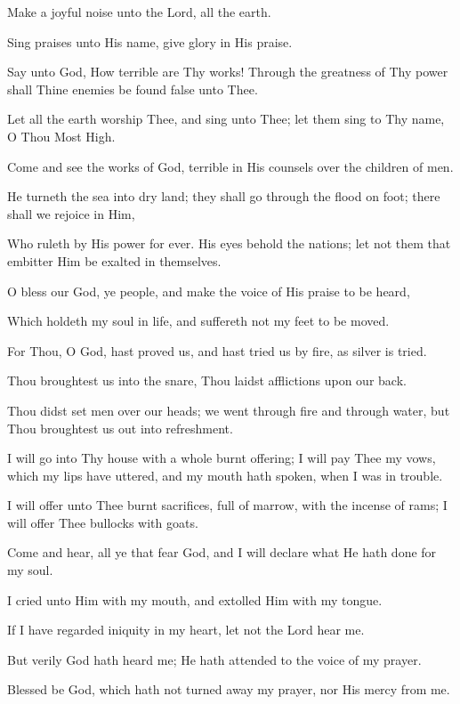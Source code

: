 Make a joyful noise unto the Lord, all the earth.

Sing praises unto His name, give glory in His praise.

Say unto God, How terrible are Thy works! Through the greatness of Thy power shall Thine enemies be found false unto Thee.

Let all the earth worship Thee, and sing unto Thee; let them sing to Thy name, O Thou Most High.

Come and see the works of God, terrible in His counsels over the children of men.

He turneth the sea into dry land; they shall go through the flood on foot; there shall we rejoice in Him,

Who ruleth by His power for ever. His eyes behold the nations; let not them that embitter Him be exalted in themselves.

O bless our God, ye people, and make the voice of His praise to be heard,

Which holdeth my soul in life, and suffereth not my feet to be moved.

For Thou, O God, hast proved us, and hast tried us by fire, as silver is tried.

Thou broughtest us into the snare, Thou laidst afflictions upon our back.

Thou didst set men over our heads; we went through fire and through water, but Thou broughtest us out into refreshment.

I will go into Thy house with a whole burnt offering; I will pay Thee my vows, which my lips have uttered, and my mouth hath spoken, when I was in trouble.

I will offer unto Thee burnt sacrifices, full of marrow, with the incense of rams; I will offer Thee bullocks with goats.

Come and hear, all ye that fear God, and I will declare what He hath done for my soul.

I cried unto Him with my mouth, and extolled Him with my tongue.

If I have regarded iniquity in my heart, let not the Lord hear me.

But verily God hath heard me; He hath attended to the voice of my prayer.

Blessed be God, which hath not turned away my prayer, nor His mercy from me.
